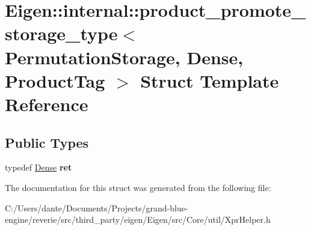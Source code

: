 \hypertarget{struct_eigen_1_1internal_1_1product__promote__storage__type_3_01_permutation_storage_00_01_dense_00_01_product_tag_01_4}{}\section{Eigen\+::internal\+::product\+\_\+promote\+\_\+storage\+\_\+type$<$ Permutation\+Storage, Dense, Product\+Tag $>$ Struct Template Reference}
\label{struct_eigen_1_1internal_1_1product__promote__storage__type_3_01_permutation_storage_00_01_dense_00_01_product_tag_01_4}
\subsection*{Public Types}
\begin{DoxyCompactItemize}
\item 
\mbox{\label{struct_eigen_1_1internal_1_1product__promote__storage__type_3_01_permutation_storage_00_01_dense_00_01_product_tag_01_4_a315df19892150524bf5b33b5fa99c94f}} 
typedef \mbox{\hyperlink{struct_eigen_1_1_dense}{Dense}} {\bfseries ret}
\end{DoxyCompactItemize}


The documentation for this struct was generated from the following file\+:\begin{DoxyCompactItemize}
\item 
C\+:/\+Users/dante/\+Documents/\+Projects/grand-\/blue-\/engine/reverie/src/third\+\_\+party/eigen/\+Eigen/src/\+Core/util/Xpr\+Helper.\+h\end{DoxyCompactItemize}

